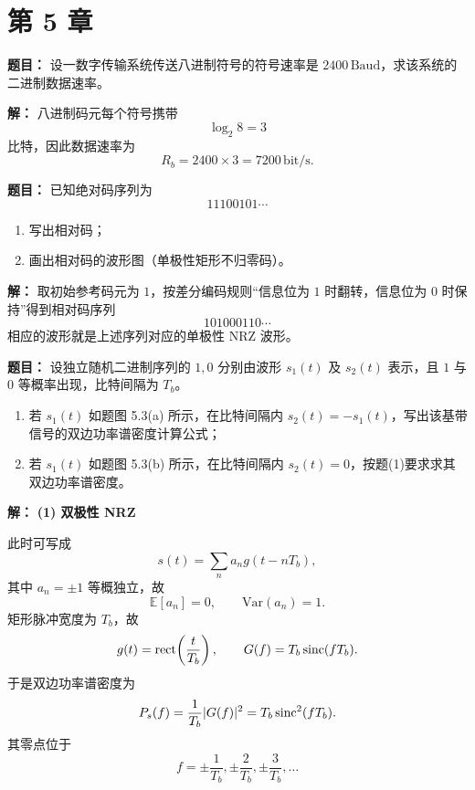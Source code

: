 \section*{第 5 章}

\textbf{题目：}
设一数字传输系统传送八进制符号的符号速率是 $2400\,\mathrm{Baud}$，求该系统的二进制数据速率。

\par\textbf{解：}
八进制码元每个符号携带
\[
\log_2 8=3
\]
比特，因此数据速率为
\[
R_b=2400\times 3=7200\,\mathrm{bit/s}.
\]

\medskip
{}
\textbf{题目：}
已知绝对码序列为
\[
11100101\cdots
\]
\begin{enumerate}
\item 写出相对码；
\item 画出相对码的波形图（单极性矩形不归零码）。
\end{enumerate}

\par\textbf{解：}
取初始参考码元为 $1$，按差分编码规则“信息位为 $1$ 时翻转，信息位为 $0$ 时保持”得到相对码序列
\[
101000110\cdots
\]
相应的波形就是上述序列对应的单极性 NRZ 波形。

\medskip
{}
\textbf{题目：}
设独立随机二进制序列的 $1,0$ 分别由波形 $s_1(t)$ 及 $s_2(t)$ 表示，且 $1$ 与 $0$ 等概率出现，比特间隔为 $T_b$。
\begin{enumerate}
\item 若 $s_1(t)$ 如题图 5.3(a) 所示，在比特间隔内 $s_2(t)=-s_1(t)$，写出该基带信号的双边功率谱密度计算公式；
\item 若 $s_1(t)$ 如题图 5.3(b) 所示，在比特间隔内 $s_2(t)=0$，按题(1)要求求其双边功率谱密度。
\end{enumerate}

\par\textbf{解：}
\textbf{(1) 双极性 NRZ}\par
此时可写成
\[
s(t)=\sum_{n}a_n g(t-nT_b),
\]
其中 $a_n=\pm 1$ 等概独立，故
\[
\mathbb{E}[a_n]=0,\qquad \mathrm{Var}(a_n)=1.
\]
矩形脉冲宽度为 $T_b$，故
\[
g(t)=\operatorname{rect}\!\left(\frac{t}{T_b}\right),
\qquad
G(f)=T_b\operatorname{sinc}(fT_b).
\]
于是双边功率谱密度为
\[
P_s(f)=\frac{1}{T_b}|G(f)|^2=T_b\operatorname{sinc}^2(fT_b).
\]
其零点位于
\[
f=\pm \frac{1}{T_b},\pm \frac{2}{T_b},\pm \frac{3}{T_b},\dots
\]

